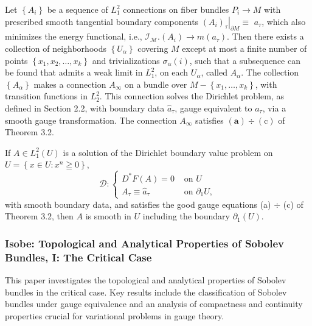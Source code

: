 \documentclass[10pt, letterpaper]{article}
\begin{document}
{\small
\begin{theorem}[Theorem 3.6.]
    Let $\left\{A_i\right\}$ be a sequence of $L_1^2$ connections on fiber bundles $P_i \rightarrow M$ with prescribed smooth tangential boundary components $\left.\left(A_i\right)_\tau\right|_{\partial M} \equiv$ $a_\tau$, which also minimizes the energy functional, i.e., $\mathscr{I}_{\mathcal{M}} .\left(A_i\right) \rightarrow m\left(a_\tau\right)$. Then there exists a collection of neighborhoods $\left\{U_\alpha\right\}$ covering $M$ except at most a finite number of points $\left\{x_1, x_2, \ldots, x_k\right\}$ and trivializations $\sigma_\alpha(i)$, such that a subsequence can be found that admits a weak limit in $L_1^2$, on each $U_\alpha$, called $A_\alpha$. The collection $\left\{A_\alpha\right\}$ makes a connection $A_{\infty}$ on a bundle over $M-\left\{x_1, \ldots, x_k\right\}$, with transition functions in $L_2^2$. This connection solves the Dirichlet problem, as defined in Section 2.2, with boundary data $\hat{a}_\tau$, gauge equivalent to $a_\tau$, via a smooth gauge transformation. The connection $A_{\infty}$ satisfies $(\mathbf{a}) \div(\mathrm{c})$ of Theorem 3.2.
\end{theorem}

\begin{theorem}[Theorem 4.5.]
    If $A \in L_1^2(U)$ is a solution of the Dirichlet boundary value problem on $U=\left\{x \in U: x^n \geqq 0\right\}$,
    $$
    \mathscr{D}: \begin{cases}D^* F(A)=0 & \text { on } U \\ A_\tau \equiv \hat{a}_\tau & \text { on } \partial_1 U,\end{cases}
    $$
    with smooth boundary data, and satisfies the good gauge equations (a) $\div$ (c) of Theorem 3.2, then $A$ is smooth in $U$ including the boundary $\partial_1(U)$.
\end{theorem}
}

\subsubsection{Isobe: Topological and Analytical Properties of Sobolev Bundles, I: The Critical Case \cite{isobe2012sobolev}} 
This paper investigates the topological and analytical properties of Sobolev bundles in the critical case. Key results include the classification of Sobolev bundles under gauge equivalence and an analysis of compactness and continuity properties crucial for variational problems in gauge theory.
\end{document}
